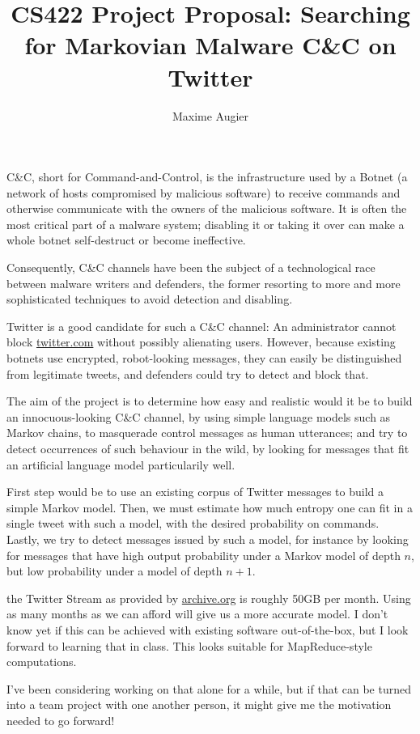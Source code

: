 \documentclass[a4paper,11pt]{article}
\title{CS422 Project Proposal: Searching for Markovian Malware C\&C on Twitter}
\author{Maxime Augier}
\begin{document}
\maketitle

C\&C, short for Command-and-Control, is the infrastructure used by a Botnet (a network of hosts compromised by malicious software) to receive
commands and otherwise communicate with the owners of the malicious software. It is often the most critical part of a malware system; disabling it or taking it over can make a whole botnet self-destruct or become ineffective.

Consequently, C\&C channels have been the subject of a technological race between malware writers and defenders, the former resorting to more and more sophisticated techniques to avoid detection and disabling.

Twitter is a good candidate for such a C\&C channel: An administrator cannot block \url{twitter.com} without possibly alienating users. However, because existing botnets use encrypted, robot-looking messages, they can easily be distinguished from legitimate tweets, and defenders could try to detect and block that.

The aim of the project is to determine how easy and realistic would it be to build an innocuous-looking C\&C channel, by using simple language models such as Markov chains, to masquerade control messages as human utterances; and try to detect occurrences of such behaviour in the wild, by looking for messages that fit an artificial language model particularily well.

First step would be to use an existing corpus of Twitter messages to build a simple Markov model. Then, we must estimate how much entropy one can fit in a single tweet with such a model, with the desired probability on commands. Lastly, we try to detect messages issued by such a model, for instance by looking for messages that have high output probability under a Markov model of depth $n$, but low probability under a model of depth $n+1$.

the Twitter Stream as provided by \url{archive.org} is roughly 50GB per month. Using as many months as we can afford will give us a more accurate model. I don't know yet if this can be achieved with existing software out-of-the-box, but I look forward to learning that in class. This looks suitable for MapReduce-style computations.

I've been considering working on that alone for a while, but if that can be turned into a team project with one another person, it might give me the motivation needed to go forward!
\end{document}
